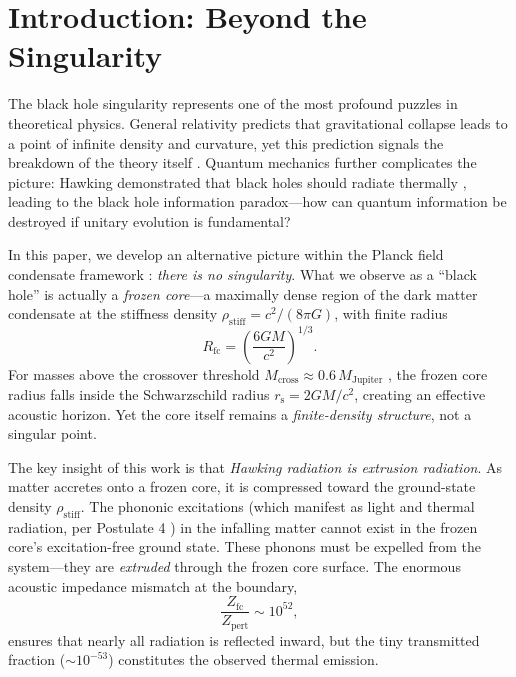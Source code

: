 \documentclass[12pt,a4paper]{article}
\newcommand{\rhostiff}{\rho_\text{stiff}}
\newcommand{\Rfc}{R_\text{fc}}
\newcommand{\Mcross}{M_\text{cross}}
\newcommand{\Zfc}{Z_\text{fc}}
\newcommand{\Zpert}{Z_\text{pert}}
\theoremstyle{definition}
\begin{document}
\newpage
\tableofcontents
\newpage

\section{Introduction: Beyond the Singularity}
\label{sec:introduction}

The black hole singularity represents one of the most profound puzzles in theoretical physics. General relativity predicts that gravitational collapse leads to a point of infinite density and curvature, yet this prediction signals the breakdown of the theory itself \cite{Penrose1965,Hawking1970}. Quantum mechanics further complicates the picture: Hawking demonstrated that black holes should radiate thermally \cite{Hawking1974,Hawking1975}, leading to the black hole information paradox—how can quantum information be destroyed if unitary evolution is fundamental?

In this paper, we develop an alternative picture within the Planck field condensate framework \cite{PlanckFieldI}: \emph{there is no singularity}. What we observe as a ``black hole'' is actually a \emph{frozen core}—a maximally dense region of the dark matter condensate at the stiffness density $\rhostiff = c^2/(8\pi G)$, with finite radius
\begin{equation}
\Rfc = \left( \frac{6GM}{c^2} \right)^{1/3}.
\label{eq:Rfc_intro}
\end{equation}
For masses above the crossover threshold $\Mcross \approx 0.6\,M_\text{Jupiter}$ \cite{PlanckFieldI}, the frozen core radius falls inside the Schwarzschild radius $r_\text{s} = 2GM/c^2$, creating an effective acoustic horizon. Yet the core itself remains a \emph{finite-density structure}, not a singular point.

The key insight of this work is that \emph{Hawking radiation is extrusion radiation}. As matter accretes onto a frozen core, it is compressed toward the ground-state density $\rhostiff$. The phononic excitations (which manifest as light and thermal radiation, per Postulate 4 \cite{PlanckFieldI}) in the infalling matter cannot exist in the frozen core's excitation-free ground state. These phonons must be expelled from the system—they are \emph{extruded} through the frozen core surface. The enormous acoustic impedance mismatch at the boundary,
\begin{equation}
\frac{\Zfc}{\Zpert} \sim 10^{52},
\label{eq:impedance_ratio_intro}
\end{equation}
ensures that nearly all radiation is reflected inward, but the tiny transmitted fraction ($\sim 10^{-53}$) constitutes the observed thermal emission.
\end{document}
